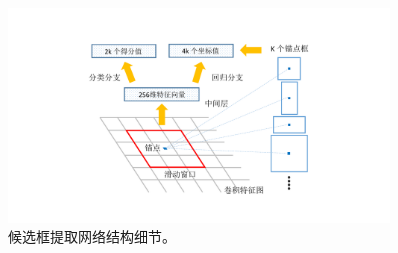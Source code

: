 \begin{figure}[t]
	\includegraphics[trim={5cm, 2cm, 5cm, 3cm}, clip,width=0.9\textwidth]{./imgs/rpn.pdf}
	\caption{候选框提取网络结构细节。}
	\label{fig:rpn}
\end{figure}
